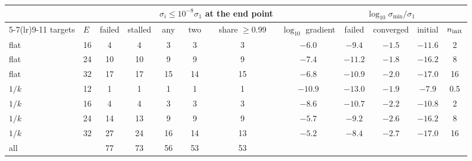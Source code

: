 \begin{tabular}{llcccccccccc}\toprule
 & & & & \multicolumn{3}{c}{$\sigma_i\le10^{-8}\sigma_1$ at the end point} & & \multicolumn{3}{c}{$\log_{10}\sigma_{\min}/\sigma_1$} & \\\cmidrule(lr){5-7}\cmidrule(lr){9-11}
targets & $E$ & failed & stalled & any & two & share $\ge0.99$ & $\log_{10}$ gradient & failed & converged & initial & $n_{\rm init}$ \\\midrule
flat & 16 & 4 & 4 & 3 & 3 & 3 & $-6.0$ & $-9.4$ & $-1.5$ & $-11.6$ & 2 \\
flat & 24 & 10 & 10 & 9 & 9 & 9 & $-7.4$ & $-11.2$ & $-1.8$ & $-16.2$ & 8 \\
flat & 32 & 17 & 17 & 15 & 14 & 15 & $-6.8$ & $-10.9$ & $-2.0$ & $-17.0$ & 16 \\
$1/k$ & 12 & 1 & 1 & 1 & 1 & 1 & $-10.9$ & $-13.0$ & $-1.9$ & $-7.9$ & 0.5 \\
$1/k$ & 16 & 4 & 4 & 3 & 3 & 3 & $-8.6$ & $-10.7$ & $-2.2$ & $-10.8$ & 2 \\
$1/k$ & 24 & 14 & 13 & 9 & 9 & 9 & $-5.7$ & $-9.2$ & $-2.6$ & $-16.2$ & 8 \\
$1/k$ & 32 & 27 & 24 & 16 & 14 & 13 & $-5.2$ & $-8.4$ & $-2.7$ & $-17.0$ & 16 \\
\midrule
all & & 77 & 73 & 56 & 53 & 53 & & & & & \\
\bottomrule
\end{tabular}
